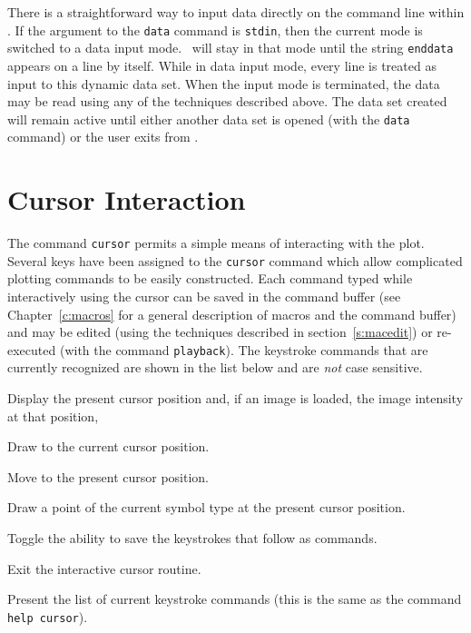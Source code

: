 There is a straightforward way to input data directly on the command
line within \wip.
If the argument to the {\tt data} command is {\tt stdin},
then the current mode is switched to a data input mode.
\wip\ will stay in that
mode until the string {\tt enddata} appears on a line by itself.
While in data input mode, every line is treated as input to this
dynamic data set.
When the input mode is terminated, the data may be read using any of
the techniques described above.
The data set created will remain active until either another data set is
opened (with the {\tt data} command) or the user exits from \wip.

\section{Cursor Interaction}

The command {\tt cursor}
permits a simple means of interacting with the plot.
Several keys have been assigned to the {\tt cursor} command
which allow complicated plotting commands to be easily constructed.
Each command typed while interactively using the cursor can be saved in the
command buffer (see Chapter~\ref{c:macros} for a
general description of macros and the command buffer)
and may be edited (using
the techniques described in section~\ref{s:macedit}) or
re-executed (with the command
{\tt playback}).
The keystroke commands that are currently recognized are shown
in the list below and are {\em not} case sensitive.

\begin{description}
  \item [{A --}] Display the present cursor position and,
    if an image is loaded, the image intensity at that position,
  \item [{D --}] Draw to the current cursor position.
  \item [{M --}] Move to the present cursor position.
  \item [{P --}] Draw a point of the current symbol type at the present
    cursor position.
  \item [{S --}] Toggle the ability to save the keystrokes
    that follow as commands.
  \item [{X --}] Exit the interactive cursor routine.
  \item [{? --}] Present the list of current keystroke commands
    (this is the same as the command {\tt help cursor}).
\end{description}

